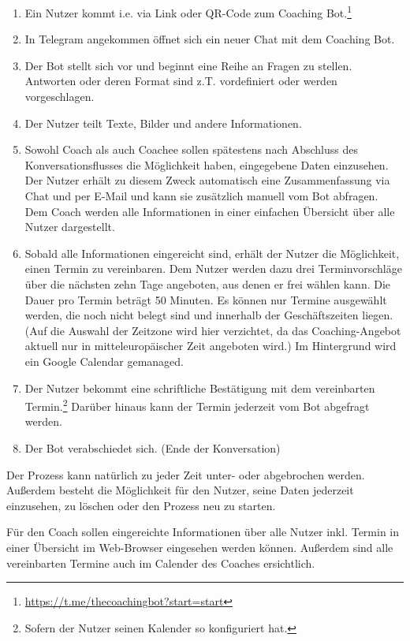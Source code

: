 	\begin{enumerate}
		\item Ein Nutzer kommt i.e. via Link oder QR-Code zum Coaching Bot.\footnote{\url{https://t.me/thecoachingbot?start=start}}
		\item In Telegram angekommen öffnet sich ein neuer Chat mit dem Coaching Bot.
		\item Der Bot stellt sich vor und beginnt eine Reihe an Fragen zu stellen. Antworten oder deren Format sind z.T. vordefiniert oder werden vorgeschlagen.
		\item Der Nutzer teilt Texte, Bilder und andere Informationen.
        \item Sowohl Coach als auch Coachee sollen spätestens nach Abschluss des Konversationsflusses die Möglichkeit haben, eingegebene Daten einzusehen. Der Nutzer erhält zu diesem Zweck automatisch eine Zusammenfassung via Chat und per E-Mail und kann sie zusätzlich manuell vom Bot abfragen. Dem Coach werden alle Informationen in einer einfachen Übersicht über alle Nutzer dargestellt.
        \item Sobald alle Informationen eingereicht sind, erhält der Nutzer die Möglichkeit, einen Termin zu vereinbaren. Dem Nutzer werden dazu drei Terminvorschläge über die nächsten zehn Tage angeboten, aus denen er frei wählen kann. Die Dauer pro Termin beträgt 50 Minuten. Es können nur Termine ausgewählt werden, die noch nicht belegt sind und innerhalb der Geschäftszeiten liegen. (Auf die Auswahl der Zeitzone wird hier verzichtet, da das Coaching-Angebot aktuell nur in mitteleuropäischer Zeit angeboten wird.) Im Hintergrund wird ein Google Calendar gemanaged.
        \item Der Nutzer bekommt eine schriftliche Bestätigung mit dem vereinbarten Termin.\footnote{Sofern der Nutzer seinen Kalender so konfiguriert hat.} Darüber hinaus kann der Termin jederzeit vom Bot abgefragt werden.
        \item Der Bot verabschiedet sich. (Ende der Konversation)

    \end{enumerate}
	Der Prozess kann natürlich zu jeder Zeit unter- oder abgebrochen werden. Außerdem besteht die Möglichkeit für den Nutzer, seine Daten jederzeit einzusehen, zu löschen oder den Prozess neu zu starten.

	Für den Coach sollen eingereichte Informationen über alle Nutzer inkl. Termin in einer Übersicht im Web-Browser eingesehen werden können. Außerdem sind alle vereinbarten Termine auch im Calender des Coaches ersichtlich.

